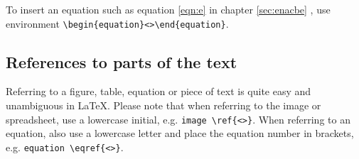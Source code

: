 To insert an equation such as equation \eqref{eqn:e} in chapter \ref{sec:enacbe} , use environment \verb|\begin{equation}<>\end{equation}|.

\subsection{References to parts of the text}\label{sec:references}

Referring to a figure, table, equation or piece of text is quite easy and unambiguous in \LaTeX. Please note that when referring to the image or spreadsheet, use a lowercase initial, e.g. \verb|image \ref{<>}|. When referring to an equation, also use a lowercase letter and place the equation number in brackets, e.g. \verb|equation \eqref{<>}|.




